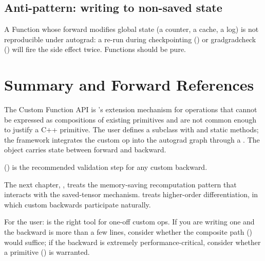 \subsection{Anti-pattern: writing to non-saved state}
\label{ssec:custom_functions:anti_state}

A Function whose forward modifies global state (a counter, a
cache, a log) is not reproducible under autograd: a re-run during
checkpointing () or
gradgradcheck () will fire the side effect
twice. Functions should be pure.

\section{Summary and Forward References}
\label{sec:custom_functions:summary}

The Custom Function API is \Lucid's extension mechanism for
operations that cannot be expressed as compositions of existing
primitives and are not common enough to justify a C++ primitive.
The user defines a  subclass with
 and 
static methods; the framework integrates the custom op into the
autograd graph through a . The
 object carries state between forward and backward.

 () is the recommended
validation step for any custom backward.

The next chapter, , treats the
memory-saving recomputation pattern that interacts with the
saved-tensor mechanism.  treats
higher-order differentiation, in which custom backwards
participate naturally.

\begin{lucidnote}
For the user:  is the right tool for one-off custom
ops. If you are writing one and the backward is more than a few
lines, consider whether the composite path
() would suffice; if the backward is
extremely performance-critical, consider whether a primitive
() is warranted.
\end{lucidnote}
